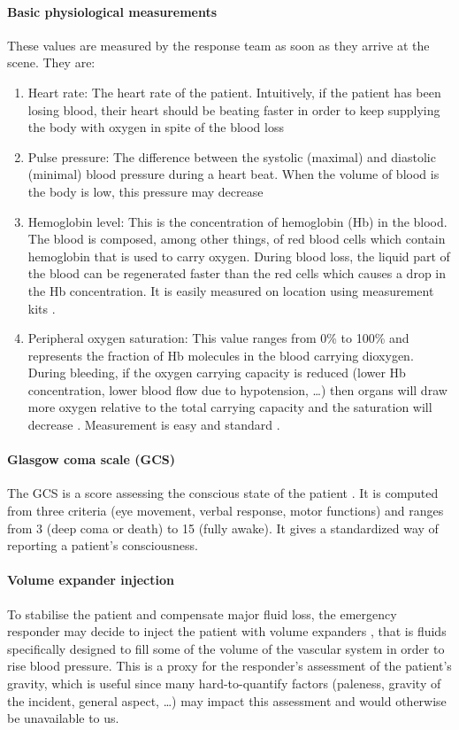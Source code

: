 \paragraph{Basic physiological measurements}
These values are measured by the response team as soon as they arrive at the scene. They are:
\begin{enumerate}
\item Heart rate: The heart rate of the patient. Intuitively, if the patient has been losing blood, their heart should be beating faster in order to keep supplying the body with oxygen in spite of the blood loss \cite{gutierrez2004clinical}
\item Pulse pressure: The difference between the systolic (maximal) and diastolic (minimal) blood pressure during a heart beat. When the volume of blood is the body is low, this pressure may decrease \cite{gutierrez2004clinical}
\item Hemoglobin level: This is the concentration of hemoglobin (Hb) in the blood. The blood is composed, among other things, of red blood cells which contain hemoglobin that is used to carry oxygen. During blood loss, the liquid part of the blood can be regenerated faster than the red cells \cite{gutierrez2004clinical} which causes a drop in the Hb concentration. It is easily measured on location using measurement kits \cite{lamhaut2011hemocue}.
\item Peripheral oxygen saturation: This value ranges from 0\% to 100\% and represents the fraction of Hb molecules in the blood carrying dioxygen. During bleeding, if the oxygen carrying capacity is reduced (lower Hb concentration, lower blood flow due to hypotension, \ldots) then organs will draw more oxygen relative to the total carrying capacity and the saturation will decrease \cite{cohn2007saturation}. Measurement is easy and standard \cite{rall1999oxymetry}.
\end{enumerate}

\paragraph{Glasgow coma scale (GCS)}
The GCS is a score assessing the conscious state of the patient \cite{jones1979GCS}. It is computed from three criteria (eye movement, verbal response, motor functions) and ranges from 3 (deep coma or death) to 15 (fully awake). It gives a standardized way of reporting a patient's consciousness.

\paragraph{Volume expander injection}
To stabilise the patient and compensate major fluid loss, the emergency responder may decide to inject the patient with volume expanders \cite{kramer2003expander}, that is fluids specifically designed to fill some of the volume of the vascular system in order to rise blood pressure. This is a proxy for the responder's assessment of the patient's gravity, which is useful since many hard-to-quantify factors (paleness, gravity of the incident, general aspect, \ldots) may impact this assessment and would otherwise be unavailable to us.

